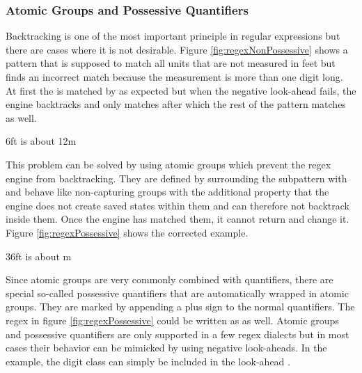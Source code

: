 \subsubsection{Atomic Groups and Possessive Quantifiers}

Backtracking is one of the most important principle in regular expressions but there are cases where it is not desirable. Figure \ref{fig:regexNonPossessive} shows a pattern that is supposed to match all units that are not measured in feet but finds an incorrect match because the measurement is more than one digit long. At first the  is matched by  as expected but when the negative look-ahead fails, the engine backtracks and only matches  after which the rest of the pattern matches as well.

\begin{listingBox}[title={Backtracking leads to incorrect Match with \pattern{\bs d+(?!ft)}},label=fig:regexNonPossessive,width=14cm,center]
    6ft is about 12m
\end{listingBox}

This problem can be solved by using atomic groups which prevent the regex engine from backtracking. They are defined by surrounding the subpattern with  and behave like non-capturing groups with the additional property that the engine does not create saved states within them and can therefore not backtrack inside them. Once the engine has matched them, it cannot return and change it. Figure \ref{fig:regexPossessive} shows the corrected example.

\begin{listingBox}[title={Atomic Groups \pattern{(?>\bs d+)(?!ft)} prevent Backtracking},label=fig:regexPossessive,width=14cm,center]
    36ft is about m
\end{listingBox}

Since atomic groups are very commonly combined with quantifiers, there are special so-called possessive quantifiers that are automatically wrapped in atomic groups. They are marked by appending a plus sign to the normal quantifiers. The regex in figure \ref{fig:regexPossessive} could be written as  as well. Atomic groups and possessive quantifiers are only supported in a few regex dialects but in most cases their behavior can be mimicked by using negative look-aheads. In the example, the digit class can simply be included in the look-ahead .

